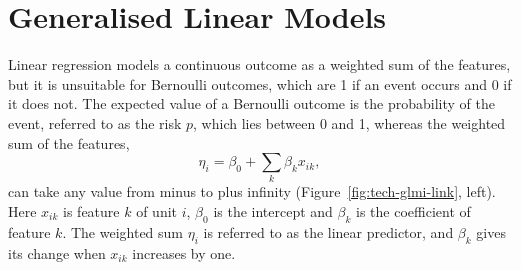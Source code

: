 %
%

\section{Generalised Linear Models}
\label{sec:tech-glmi}

Linear regression models a continuous outcome as a weighted sum of the features, but it is unsuitable for Bernoulli outcomes, which are 1 if an event occurs and 0 if it does not.
The expected value of a Bernoulli outcome is the probability of the event, referred to as the risk $p$, which lies between 0 and 1, whereas the weighted sum of the features,
\begin{equation}
  \eta_i = \beta_0 + \sum_k \beta_k x_{ik},
  \label{eq:tech-lp}
\end{equation}
can take any value from minus to plus infinity (Figure~\ref{fig:tech-glmi-link}, left).
Here $x_{ik}$ is feature $k$ of unit $i$, $\beta_0$ is the intercept and $\beta_k$ is the coefficient of feature $k$.
The weighted sum $\eta_i$ is referred to as the linear predictor, and $\beta_k$ gives its change when $x_{ik}$ increases by one.

